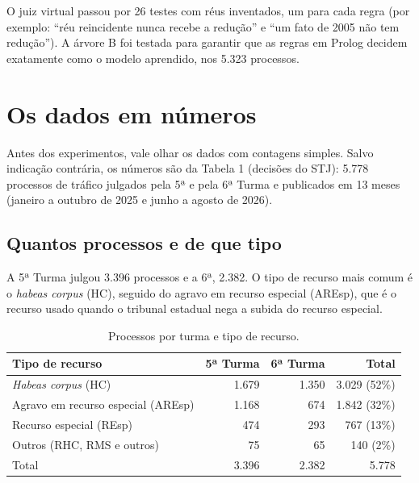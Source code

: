 O juiz virtual passou por 26 testes com réus inventados, um para cada regra (por exemplo:
``réu reincidente nunca recebe a redução'' e ``um fato de 2005 não tem redução''). A árvore B
foi testada para garantir que as regras em Prolog decidem exatamente como o modelo
aprendido, nos 5.323 processos.

\section{Os dados em números}
\label{sec:dados}

Antes dos experimentos, vale olhar os dados com contagens simples. Salvo indicação
contrária, os números são da Tabela 1 (decisões do STJ): 5.778 processos de tráfico
julgados pela 5ª e pela 6ª Turma e publicados em 13 meses (janeiro a outubro de 2025 e junho
a agosto de 2026).

\subsection*{Quantos processos e de que tipo}

A 5ª Turma julgou 3.396 processos e a 6ª, 2.382. O tipo de recurso mais comum é o
\emph{habeas corpus} (HC), seguido do agravo em recurso especial (AREsp), que é o recurso
usado quando o tribunal estadual nega a subida do recurso especial.

\begin{table}[h]
\centering\small
\caption{Processos por turma e tipo de recurso.}
\label{tab:dados-classe}
\begin{tabular}{lrrr}
\toprule
Tipo de recurso & 5ª Turma & 6ª Turma & Total \\
\midrule
\emph{Habeas corpus} (HC) & 1.679 & 1.350 & 3.029 (52\%) \\
Agravo em recurso especial (AREsp) & 1.168 & 674 & 1.842 (32\%) \\
Recurso especial (REsp) & 474 & 293 & 767 (13\%) \\
Outros (RHC, RMS e outros) & 75 & 65 & 140 (2\%) \\
\midrule
Total & 3.396 & 2.382 & 5.778 \\
\bottomrule
\end{tabular}
\end{table}

